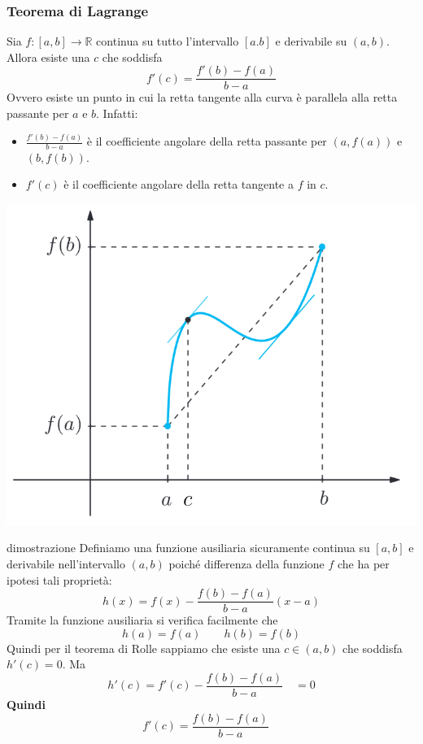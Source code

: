 \documentclass[x11names]{article}
\begin{document}
	\begin{center}
		\colorbox{myred}{\begin{minipage}{5.75in}
				\begin{redes}{}
					\subsubsection{Teorema di Lagrange}
					Sia $f: [a,b] \to \mathbb{R}$ continua su tutto l'intervallo $[a.b]$ e derivabile su $(a,b)$. Allora esiste una $c$ che soddisfa
					\[
					f'(c) = \frac{f'(b) - f(a)}{b - a}
					\]
					Ovvero esiste un punto in cui la retta tangente alla curva è parallela alla retta passante per $a$ e $b$. Infatti:
					\begin{itemize}
						\item $\frac{f'(b) - f(a)}{b - a}$ è il coefficiente angolare della retta passante per $(a,f(a))$ e $(b,f(b))$.
						\item $f'(c)$ è il coefficiente angolare della retta tangente  a $f$ in $c$.
					\end{itemize}
				\end{redes}
		\end{minipage}}        
	\end{center}
	\begin{center}
		\includegraphics[scale=0.45]{figures/lagrange}
	\end{center}
	\begin{es}{dimostrazione}
		Definiamo una funzione ausiliaria sicuramente continua su $[a,b]$ e derivabile nell'intervallo $(a,b)$ poiché differenza della funzione $f$ che ha per ipotesi tali proprietà:
		\[
		h(x) = f(x) - \frac{f(b) - f(a)}{b - a}(x-a)
		\]
		Tramite la funzione ausiliaria si verifica facilmente che 
		\[
		h(a) = f(a) \qquad h(b) = f(b)
		\]
		Quindi per il teorema di Rolle sappiamo che esiste una $c \in (a,b)$ che soddisfa $h'(c) = 0$. Ma 
		\[
		h'(c) = f'(c) - \frac{f(b) - f(a)}{b - a} \quad = 0
		\]
		\textbf{Quindi}
		\[
		f'(c) = \frac{f(b) - f(a)}{b - a} \quad 
		\]
	\end{es}
\end{document}

